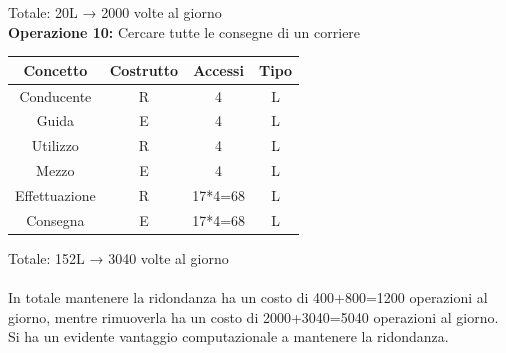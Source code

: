 \documentclass[a4paper,12pt]{report}
\begin{document}
Totale: 20L → 2000 volte al giorno\\
\textbf{Operazione 10:}
Cercare tutte le consegne di un corriere\\
\begin{center}
    \begin{tabular}{ | c   c   c   c | } 
    \hline
	Concetto&Costrutto&Accessi&Tipo\\
	\hline
	Conducente&R&4&L\\
	\hline
	Guida&E&4&L\\
	\hline
	Utilizzo&R&4&L\\
	\hline
	Mezzo&E&4&L\\
	\hline
	Effettuazione&R&17*4=68&L\\
	\hline
    Consegna&E&17*4=68&L\\
	\hline
	\end{tabular}
\end{center}
Totale: 152L → 3040 volte al giorno\\
\\
In totale mantenere la ridondanza ha un costo di 400+800=1200 operazioni al giorno, mentre rimuoverla ha un costo di 2000+3040=5040 operazioni al giorno. Si ha un evidente vantaggio computazionale a mantenere la ridondanza.\\
\end{document}
